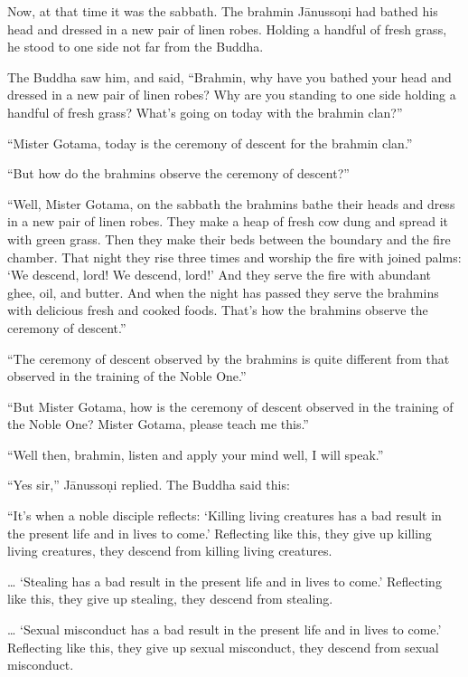 \documentclass[12pt,openany]{book}%
\begin{document}
Now, at that time it was the sabbath. The brahmin \textsanskrit{Jānussoṇi} had bathed his head and dressed in a new pair of linen robes. Holding a handful of fresh grass, he stood to one side not far from the Buddha. 

The Buddha saw him, and said, “Brahmin, why have you bathed your head and dressed in a new pair of linen robes? Why are you standing to one side holding a handful of fresh grass? What’s going on today with the brahmin clan?” 

“Mister Gotama, today is the ceremony of descent for the brahmin clan.” 

“But how do the brahmins observe the ceremony of descent?” 

“Well, Mister Gotama, on the sabbath the brahmins bathe their heads and dress in a new pair of linen robes. They make a heap of fresh cow dung and spread it with green grass. Then they make their beds between the boundary and the fire chamber. That night they rise three times and worship the fire with joined palms: ‘We descend, lord! We descend, lord!’ And they serve the fire with abundant ghee, oil, and butter. And when the night has passed they serve the brahmins with delicious fresh and cooked foods. That’s how the brahmins observe the ceremony of descent.” 

“The ceremony of descent observed by the brahmins is quite different from that observed in the training of the Noble One.” 

“But Mister Gotama, how is the ceremony of descent observed in the training of the Noble One? Mister Gotama, please teach me this.” 

“Well then, brahmin, listen and apply your mind well, I will speak.” 

“Yes sir,” \textsanskrit{Jānussoṇi} replied. The Buddha said this: 

“It’s when a noble disciple reflects: ‘Killing living creatures has a bad result in the present life and in lives to come.’ Reflecting like this, they give up killing living creatures, they descend from killing living creatures. 

… ‘Stealing has a bad result in the present life and in lives to come.’ Reflecting like this, they give up stealing, they descend from stealing. 

… ‘Sexual misconduct has a bad result in the present life and in lives to come.’ Reflecting like this, they give up sexual misconduct, they descend from sexual misconduct. 
\end{document}
